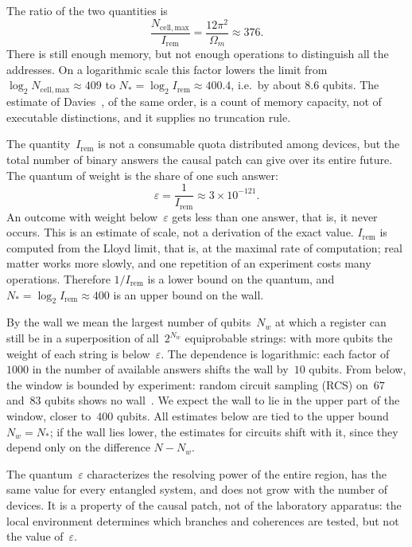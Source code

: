 \documentclass[11pt,a4paper]{article}
\newcommand{\Ost}{I_{\mathrm{rem}}}
\begin{document}
The ratio of the two quantities is
\[
\frac{N_{\mathrm{cell,max}}}{\Ost}
=\frac{12\pi^2}{\Omega_m}
\approx 376.
\]
There is still enough memory, but not enough operations to distinguish all the addresses. On a logarithmic scale this factor lowers the limit from $\log_2 N_{\mathrm{cell,max}}\approx 409$ to $N_*=\log_2\Ost\approx 400.4$, i.e.\ by about $8.6$ qubits. The estimate of Davies~\cite{davies2007}, of the same order, is a count of memory capacity, not of executable distinctions, and it supplies no truncation rule.

The quantity~$\Ost$ is not a consumable quota distributed among devices, but the total number of binary answers the causal patch can give over its entire future. The quantum of weight is the share of one such answer:
\begin{equation}
\varepsilon = \frac{1}{\Ost}\approx 3\times 10^{-121}.
\end{equation}
An outcome with weight below~$\varepsilon$ gets less than one answer, that is, it never occurs. This is an estimate of scale, not a derivation of the exact value. $\Ost$ is computed from the Lloyd limit, that is, at the maximal rate of computation; real matter works more slowly, and one repetition of an experiment costs many operations. Therefore $1/\Ost$ is a lower bound on the quantum, and $N_*=\log_2\Ost\approx400$ is an upper bound on the wall.

By the wall we mean the largest number of qubits~$N_w$ at which a register can still be in a superposition of all~$2^{N_w}$ equiprobable strings: with more qubits the weight of each string is below~$\varepsilon$. The dependence is logarithmic: each factor of~$1000$ in the number of available answers shifts the wall by~$10$ qubits. From below, the window is bounded by experiment: random circuit sampling (RCS) on~$67$ and~$83$ qubits shows no wall~\cite{morvan2024,gao2025}. We expect the wall to lie in the upper part of the window, closer to~$400$ qubits. All estimates below are tied to the upper bound $N_w=N_*$; if the wall lies lower, the estimates for circuits shift with it, since they depend only on the difference $N-N_w$.

The quantum~$\varepsilon$ characterizes the resolving power of the entire region, has the same value for every entangled system, and does not grow with the number of devices. It is a property of the causal patch, not of the laboratory apparatus: the local environment determines which branches and coherences are tested, but not the value of~$\varepsilon$.
\end{document}
